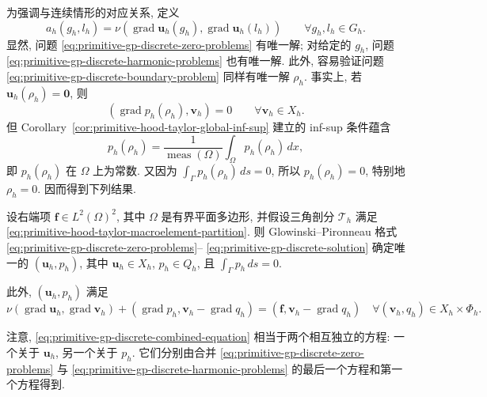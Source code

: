 为强调与连续情形的对应关系, 定义
\[
a_h(g_h,l_h)=\nu(\operatorname{grad}\mathbf u_h(g_h),
\operatorname{grad}\mathbf u_h(l_h))
\qquad\forall g_h,l_h\in G_h.
\]
显然, 问题 \eqref{eq:primitive-gp-discrete-zero-problems} 有唯一解; 对给定的
$g_h$, 问题 \eqref{eq:primitive-gp-discrete-harmonic-problems} 也有唯一解.
此外, 容易验证问题 \eqref{eq:primitive-gp-discrete-boundary-problem} 同样有唯一解
$\rho_h$. 事实上, 若 $\mathbf u_h(\rho_h)=\mathbf0$, 则
\[
(\operatorname{grad}p_h(\rho_h),\mathbf v_h)=0
\qquad\forall\mathbf v_h\in X_h.
\]
但 Corollary~\ref{cor:primitive-hood-taylor-global-inf-sup} 建立的 inf-sup 条件蕴含
\[
p_h(\rho_h)=\frac1{\operatorname{meas}(\Omega)}
\int_\Omega p_h(\rho_h)\,dx,
\]
即 $p_h(\rho_h)$ 在 $\Omega$ 上为常数. 又因为
$\int_\Gamma p_h(\rho_h)\,ds=0$, 所以 $p_h(\rho_h)=0$, 特别地
$\rho_h=0$. 因而得到下列结果.

\setcounter{statement}{2}
\renewcommand{\theHstatement}{lemma.\thesection.\arabic{statement}}
\begin{Lemma}\label{lem:primitive-gp-discrete-wellposedness}
设右端项 $\mathbf f\in L^2(\Omega)^2$, 其中 $\Omega$ 是有界平面多边形,
并假设三角剖分 $\mathcal T_h$ 满足
\eqref{eq:primitive-hood-taylor-macroelement-partition}. 则 Glowinski--Pironneau
格式 \eqref{eq:primitive-gp-discrete-zero-problems}--
\eqref{eq:primitive-gp-discrete-solution} 确定唯一的
$(\mathbf u_h,p_h)$, 其中 $\mathbf u_h\in X_h$, $p_h\in Q_h$, 且
$\int_\Gamma p_h\,ds=0$.

此外, $(\mathbf u_h,p_h)$ 满足
\begin{equation}\label{eq:primitive-gp-discrete-combined-equation}
\nu(\operatorname{grad}\mathbf u_h,\operatorname{grad}\mathbf v_h)
+(\operatorname{grad}p_h,\mathbf v_h-\operatorname{grad}q_h)
=(\mathbf f,\mathbf v_h-\operatorname{grad}q_h)
\quad\forall(\mathbf v_h,q_h)\in X_h\times\Phi_h.
\end{equation}
\end{Lemma}

注意, \eqref{eq:primitive-gp-discrete-combined-equation} 相当于两个相互独立的方程:
一个关于 $\mathbf u_h$, 另一个关于 $p_h$. 它们分别由合并
\eqref{eq:primitive-gp-discrete-zero-problems} 与
\eqref{eq:primitive-gp-discrete-harmonic-problems} 的最后一个方程和第一个方程得到.

